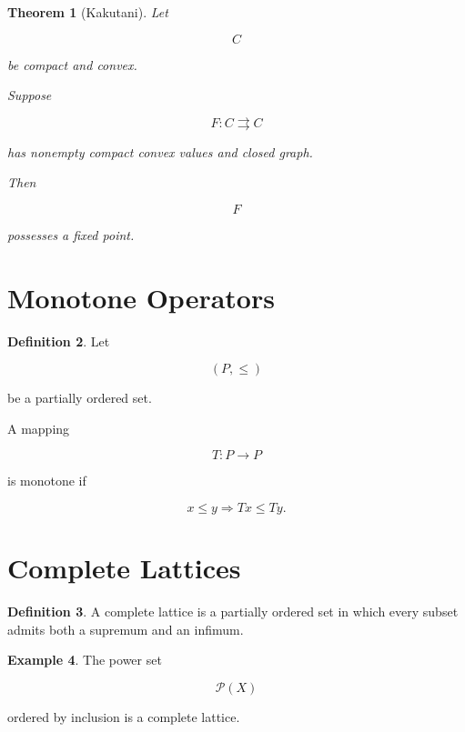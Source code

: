 \documentclass[11pt]{book}
\numberwithin{equation}{chapter}
\theoremstyle{definition}
\newtheorem{definition}{Definition}[chapter]
\newtheorem{example}[definition]{Example}
\theoremstyle{plain}
\newtheorem{theorem}[definition]{Theorem}
\begin{document}
\begin{theorem}[Kakutani]

Let

\[
C
\]

be compact and convex.

Suppose

\[
F:C
\rightrightarrows
C
\]

has nonempty compact convex values and closed graph.

Then

\[
F
\]

possesses a fixed point.

\end{theorem}


\section{Monotone Operators}

\begin{definition}

Let

\[
(P,\le)
\]

be a partially ordered set.

A mapping

\[
T:P\rightarrow P
\]

is monotone if

\[
x\le y
\Longrightarrow
Tx\le Ty.
\]

\end{definition}


\section{Complete Lattices}

\begin{definition}

A complete lattice is a partially ordered set in which every subset
admits both a supremum and an infimum.

\end{definition}


\begin{example}

The power set

\[
\mathcal P(X)
\]

ordered by inclusion is a complete lattice.

\end{example}
\end{document}
